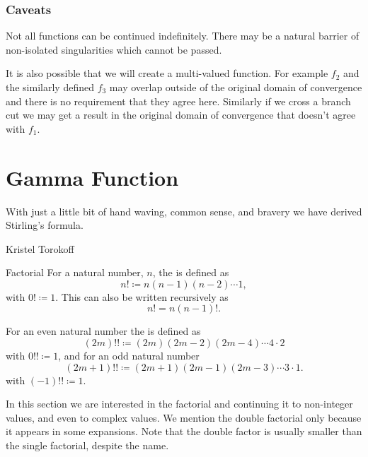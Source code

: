 \documentclass[fleqn]{NotesClass}
\begin{document}
    \subsection{Caveats}
    Not all functions can be continued indefinitely.
    There may be a natural barrier of non-isolated singularities which cannot be passed.
    
    It is also possible that we will create a multi-valued function.
    For example \(f_2\) and the similarly defined \(f_3\) may overlap outside of the original domain of convergence and there is no requirement that they agree here.
    Similarly if we cross a branch cut we may get a result in the original domain of convergence that doesn't agree with \(f_1\).
    
    \chapter{Gamma Function}
    \epigraph{With just a little bit of hand waving, common sense, and bravery we have derived Stirling's formula.}{Kristel Torokoff}
    \begin{dfn}{Factorial}{}
        For a natural number, \(n\), the  is defined as
        \begin{equation}
            n! \coloneqq n(n - 1)(n - 2) \dotsm 1,
        \end{equation}
        with \(0! \coloneqq 1\).
        This can also be written recursively as
        \begin{equation}
            n! = n(n-1)!.
        \end{equation}
        
        For an even natural number the  is defined as
        \begin{equation}
            (2m)!! \coloneqq (2m)(2m-2)(2m-4) \dotsm 4\cdot 2
        \end{equation}
        with \(0!! \coloneqq 1\), and for an odd natural number
        \begin{equation}
            (2m + 1)!! \coloneqq (2m + 1)(2m - 1)(2m - 3) \dotsm 3\cdot 1.
        \end{equation}
        with \((-1)!! \coloneqq 1\).
    \end{dfn}
    In this section we are interested in the factorial and continuing it to non-integer values, and even to complex values.
    We mention the double factorial only because it appears in some expansions.
    Note that the double factor is usually smaller than the single factorial, despite the name.
    
\end{document}
